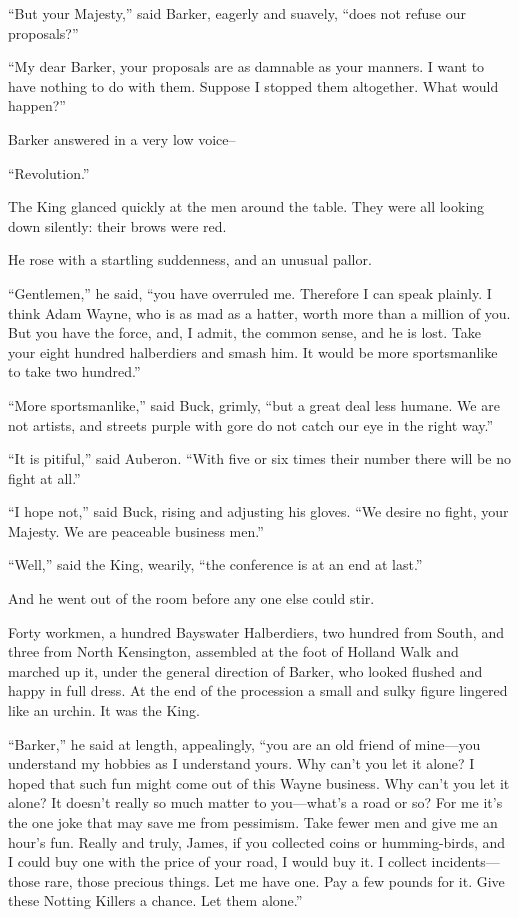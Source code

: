\documentclass{book}
\begin{document}
“But your Majesty,” said Barker, eagerly and suavely, “does not refuse our proposals?”

“My dear Barker, your proposals are as damnable as your manners. I want to have nothing to do with them. Suppose I stopped them altogether. What would happen?”

Barker answered in a very low voice–

“Revolution.”

The King glanced quickly at the men around the table. They were all looking down silently: their brows were red.

He rose with a startling suddenness, and an unusual pallor.

“Gentlemen,” he said, “you have overruled me. Therefore I can speak plainly. I think Adam Wayne, who is as mad as a hatter, worth more than a million of you. But you have the force, and, I admit, the common sense, and he is lost. Take your eight hundred halberdiers and smash him. It would be more sportsmanlike to take two hundred.”

“More sportsmanlike,” said Buck, grimly, “but a great deal less humane. We are not artists, and streets purple with gore do not catch our eye in the right way.”

“It is pitiful,” said Auberon. “With five or six times their number there will be no fight at all.”

“I hope not,” said Buck, rising and adjusting his gloves. “We desire no fight, your Majesty. We are peaceable business men.”

“Well,” said the King, wearily, “the conference is at an end at last.”

And he went out of the room before any one else could stir.

Forty workmen, a hundred Bayswater Halberdiers, two hundred from South, and three from North Kensington, assembled at the foot of Holland Walk and marched up it, under the general direction of Barker, who looked flushed and happy in full dress. At the end of the procession a small and sulky figure lingered like an urchin. It was the King.

“Barker,” he said at length, appealingly, “you are an old friend of mine—you understand my hobbies as I understand yours. Why can’t you let it alone? I hoped that such fun might come out of this Wayne business. Why can’t you let it alone? It doesn’t really so much matter to you—what’s a road or so? For me it’s the one joke that may save me from pessimism. Take fewer men and give me an hour’s fun. Really and truly, James, if you collected coins or humming-birds, and I could buy one with the price of your road, I would buy it. I collect incidents—those rare, those precious things. Let me have one. Pay a few pounds for it. Give these Notting Killers a chance. Let them alone.”
\end{document}
